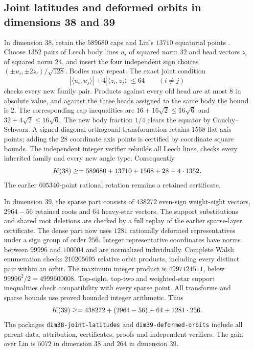 \documentclass[11pt]{amsart}
\theoremstyle{remark}
\newcommand{\ip}[2]{\langle #1,#2\rangle}
\begin{document}
\subsection{Joint latitudes and deformed orbits in dimensions 38 and 39}\label{ss:d3839current}

In dimension $38$, retain the $589680$ caps and Lin's $13710$ equatorial
points \cite{lin33-2026}. Choose $1352$ pairs of Leech body lines $u_i$
of squared norm $32$ and head vectors $z_i$ of squared norm $24$, and insert
the four independent sign choices $(\pm u_i,\pm2z_i)/\sqrt{128}$.
Bodies may repeat. The exact joint condition
\[
 |\ip{u_i}{u_j}|+4|\ip{z_i}{z_j}|\le64\qquad(i\ne j)
\]
checks every new family pair. Products against every old head are at most
$8$ in absolute value, and against the three heads assigned to the same
body the bound is $2$. The corresponding cap inequalities are
$16+16\sqrt2\le16\sqrt6$ and $32+4\sqrt2\le16\sqrt6$.
The new body fraction $1/4$ clears the equator by Cauchy--Schwarz.
A signed diagonal orthogonal transformation retains $1568$ flat axis
points; adding the $28$ coordinate axis points is certified by coordinate
square bounds. The independent integer verifier rebuilds all Leech lines,
checks every inherited family and every new angle type. Consequently
\[
 K(38)\ge\Kcur{38}=589680+13710+1568+28+4\cdot1352.
\]
The earlier $605346$-point rational rotation remains a retained certificate.

In dimension $39$, the sparse part consists of $438272$ even-sign
weight-eight vectors, $2964-56$ retained roots and $64$ heavy-star vectors.
The support substitutions and shared root deletions are checked by a full
replay of the earlier sparse-layer certificate. The dense part now uses
$1281$ rationally deformed representatives under a sign group of order
$256$. Integer representative coordinates have norms between
$99996$ and $100004$ and are normalized individually. Complete Walsh enumeration
checks $210205695$ relative orbit products, including every distinct pair
within an orbit. The maximum integer product is $4997124511$, below
$99996^2/2=4999600008$. Top-eight, top-two and weighted-star support
inequalities check compatibility with every sparse point. All transforms
and sparse bounds use proved bounded integer arithmetic. Thus
\[
 K(39)\ge\Kcur{39}=438272+(2964-56)+64+1281\cdot256.
\]
The packages \texttt{dim38-joint-latitudes} and
\texttt{dim39-deformed-orbits} include all parent data, attribution,
certificates, proofs and independent verifiers. The gain over Lin is
$5072$ in dimension $38$ and $264$ in dimension $39$.
\end{document}
